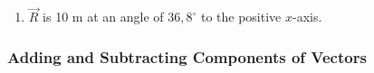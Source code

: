 {\begin{mdframed}[linewidth=4, leftmargin=40, rightmargin=40]
\begin{exercise}
\begin{enumerate}[noitemsep, label=\textbf{Step} \textbf{\arabic*}. ]
{\begin{equation}
      \end{equation}
    }{%
    \setlength{\mymathboxwidth}{\columnwidth}
      \addtolength{\mymathboxwidth}{-48pt}
    \par\vspace{12pt}\noindent\begin{minipage}{\columnwidth}
    \parbox[t]{\mymathboxwidth}{\large\begin{math}
    tan\alpha =\frac{6\phantom{\rule{2pt}{0ex}}\mathrm{m}\ensuremath{\cdot}{\mathrm{s}}^{-1}}{8\phantom{\rule{2pt}{0ex}}\mathrm{m}\ensuremath{\cdot}{\mathrm{s}}^{-1}}\alpha ={tan}^{-1}\frac{6\phantom{\rule{2pt}{0ex}}\mathrm{m}\ensuremath{\cdot}{\mathrm{s}}^{-1}}{8\phantom{\rule{2pt}{0ex}}\mathrm{m}\ensuremath{\cdot}{\mathrm{s}}^{-1}}\alpha =36,{8}^{\circ }\end{math}}\hfill
    \parbox[t]{48pt}{\raggedleft 
    (19.24)}
    \end{minipage}\vspace{12pt}\par
    }%
    
        
        \item  
        \label{m38819*id196058}\begin{math}\stackrel{\to }{R}\end{math} is 10 m at an angle of \begin{math}36,{8}^{\circ }\end{math} to the positive \begin{math}x\end{math}-axis. \par 
        \end{enumerate}
         

    \end{exercise}
    \end{mdframed}
    }
    \noindent
  
\label{m38819*secfhsst!!!underscore!!!id3383}
            \subsubsection{  Adding and Subtracting Components of Vectors }
            \nopagebreak
            
